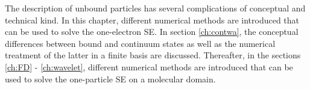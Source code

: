 The description of unbound particles has several complications of conceptual and technical kind.
In this chapter, different numerical methods are introduced that can be used to solve the one-electron SE.
In section \ref{ch:contwa}, the conceptual differences between bound and continuum states as well as the numerical treatment of the latter in a finite basis are discussed.
Thereafter, in the sections \ref{ch:FD} - \ref{ch:wavelet}, different numerical methods are introduced that can be used to solve the one-particle SE on a molecular domain.

